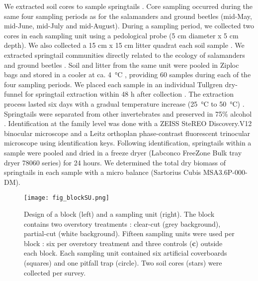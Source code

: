 We extracted soil cores to sample springtails \citep{pongeVerticalDistributionCollembola2000,salamonEffectsPlantDiversity2004,chauvatChangesSoilFaunal2011a,farskaManagementIntensityAffects2014}. 
Core sampling occurred during the same four sampling periods as for the salamanders and ground beetles (mid-May, mid-June, mid-July and mid-August). 
During a sampling period, we collected two cores in each sampling unit using a pedological probe (5 cm diameter x 5 cm depth). 
We also collected a 15 cm x 15 cm litter quadrat each soil sample \citep{raymond-leonardSpringtailCommunityStructure2018a,rousseauForestFloorMesofauna2018}.
We extracted springtail communities directly related to the ecology of salamanders and ground beetles \citep{edwardsAssessmentPopulationsSoilinhabiting1991,chauvatChangesSoilFaunal2011a,raymond-leonardSpringtailCommunityStructure2018a,rousseauForestFloorMesofauna2018}.
Soil and litter from the same unit were pooled in Ziploc\up{\texttrademark{}} bags and stored in a cooler at ca. 4 °C \citep{chauvatChangesSoilFaunal2011a,rousseauForestFloorMesofauna2018}, providing 60 samples during each of the four sampling periods.
We placed each sample in an individual Tullgren dry-funnel for springtail extraction within 48 h after collection \citep{rusekBiodiversityCollembolaTheir1998,wuCompositionSpatiotemporalVariation2014,rousseauForestFloorMesofauna2018}. 
The extraction process lasted six days with a gradual temperature increase (25 °C to 50 °C) \citep{raymond-leonardSpringtailCommunityStructure2018a}.
Springtails were separated from other invertebrates and preserved in 75\% alcohol \citep{wuCompositionSpatiotemporalVariation2014}.
Identification at the family level was done with a ZEISS SteREO Discovery.V12 binocular microscope and a Leitz orthoplan phase-contrast fluorescent trinocular microscope using \cite{bellingerChecklistCollembolaWorld1996} identification keys. 
Following identification, springtails within a sample were pooled and dried in a freeze dryer (Labconco FreeZone Bulk tray dryer 78060 series) for 24 hours. 
We determined the total dry biomass of springtails in each sample with a micro balance (Sartorius Cubis\up{\texttrademark{}} MSA3.6P-000-DM).

\pagebreak

\begin{figure}[ht]
	\centering
	\texttt{[image: fig\_blockSU.png]}
	\caption[Design of one block and one sampling unit with three sampling methods.]{
  Design of a block (left) and a sampling unit (right). 
  The block contains two overstory treatments : clear-cut (grey background), partial-cut (white background). 
  Fifteen sampling units were used per block : six per overstory treatment and three controls (\textbf{c}) outside each block.
  Each sampling unit contained six artificial coverboards (squares) and one pitfall trap (circle). Two soil cores (stars) were collected per survey.
  }
	\label{fig:blockSU}
	\end{figure}  

